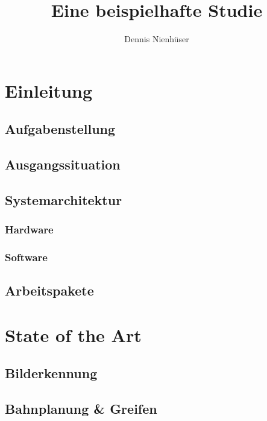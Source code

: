 \documentclass[de,ids]{fziartcl}
\author{Dennis Nienhüser}
\title{Eine beispielhafte Studie}
\begin{document}
\maketitle

\tableofcontents
\newpage

\section{Einleitung}
\subsection{Aufgabenstellung}

\subsection{Ausgangssituation}

\subsection{Systemarchitektur}
\subsubsection{Hardware}

\subsubsection{Software}

\subsection{Arbeitspakete}


\section{State of the Art}
\subsection{Bilderkennung}

\subsection{Bahnplanung \& Greifen}


\end{document}

